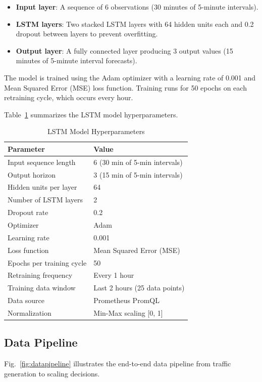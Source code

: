 \documentclass[journal]{IEEEtran}
\begin{document}
\begin{itemize}
    \item \textbf{Input layer}: A sequence of 6 observations (30 minutes of 5-minute intervals).
    \item \textbf{LSTM layers}: Two stacked LSTM layers with 64 hidden units each and 0.2 dropout between layers to prevent overfitting.
    \item \textbf{Output layer}: A fully connected layer producing 3 output values (15 minutes of 5-minute interval forecasts).
\end{itemize}

The model is trained using the Adam optimizer with a learning rate of 0.001 and Mean Squared Error (MSE) loss function. Training runs for 50 epochs on each retraining cycle, which occurs every hour.

Table~\ref{tab:lstm} summarizes the LSTM model hyperparameters.

\begin{table}[h]
\centering
\caption{LSTM Model Hyperparameters}
\label{tab:lstm}
\begin{tabular}{@{}ll@{}}
\toprule
\textbf{Parameter} & \textbf{Value} \\
\midrule
Input sequence length & 6 (30 min of 5-min intervals) \\
Output horizon & 3 (15 min of 5-min intervals) \\
Hidden units per layer & 64 \\
Number of LSTM layers & 2 \\
Dropout rate & 0.2 \\
Optimizer & Adam \\
Learning rate & 0.001 \\
Loss function & Mean Squared Error (MSE) \\
Epochs per training cycle & 50 \\
Retraining frequency & Every 1 hour \\
Training data window & Last 2 hours (25 data points) \\
Data source & Prometheus PromQL \\
Normalization & Min-Max scaling [0, 1] \\
\bottomrule
\end{tabular}
\end{table}

\subsection{Data Pipeline}
Fig.~\ref{fig:datapipeline} illustrates the end-to-end data pipeline from traffic generation to scaling decisions.
\end{document}
